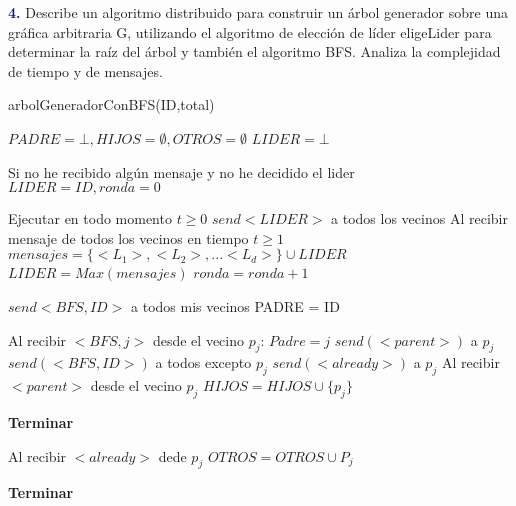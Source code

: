 \newpage
\textbf{\textcolor{MidnightBlue}{4.}}
Describe un algoritmo distribuido para construir un árbol generador sobre una gráfica
arbitraria G, utilizando el algoritmo de elección de líder eligeLider para determinar la raíz del
árbol y también el algoritmo BFS. Analiza la complejidad de tiempo y de mensajes.

\begin{algorithm}
\caption{arbolGeneradorConBFS(ID,total)}\label{alg:cap}
\begin{algorithmic}[1]

\State $PADRE = \bot, HIJOS = \emptyset, OTROS= \emptyset$
\State $LIDER = \bot$

\State Si no he recibido algún mensaje y no he decidido el lider
     
        \State $LIDER = ID, ronda = 0$

        \State Ejecutar en todo momento $t \geq 0$
        \State $send<LIDER>$ a todos los vecinos
        \State Al recibir mensaje de todos los vecinos en tiempo $t \geq1 $
        \State $mensajes = \{<L_1>,<L_2>,...<L_d>\} \cup LIDER$
        \State $LIDER = Max(mensajes)$
        \State $ronda = ronda+1$

         


         
        \State $send<BFS,ID>$ a todos mis vecinos
        \State PADRE = ID
    \EndIf

    \State Al recibir $<BFS,j>$ desde el vecino $p_j$:
            \State $Padre = j$
            \State $send(<parent>)$ a $p_j$
            \State $send(<BFS,ID>)$ a todos excepto $p_j$
        \Else
            \State $send(<already>)$ a $p_j$
        \EndIf
    \State Al recibir $<parent>$ desde el vecino $p_j$
    \State $HIJOS = HIJOS \cup \{p_j\}$

        \State \textbf{Terminar}
    \EndIf

    \State Al recibir $<already>$ dede $p_j$
    \State $OTROS = OTROS \cup P_j$

        \State \textbf{Terminar}
    \EndIf



        \EndIf
    \EndIf
    
\end{algorithmic}
\end{algorithm}


